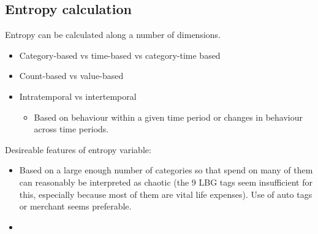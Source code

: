 




\subsection{Entropy calculation}%
\label{sub:entropy_calculation}


Entropy can be calculated along a number of dimensions.

\begin{itemize}
    \item Category-based vs time-based vs category-time based
        \citep{guidotti2015behavioral, krumme2013predictability}

    \item Count-based vs value-based

    \item Intratemporal vs intertemporal \citep{krumme2013predictability}

        \begin{itemize}
            \item Based on behaviour within a given time period or changes in
                behaviour across time periods.
        \end{itemize}
        
\end{itemize}

Desireable features of entropy variable:

\begin{itemize}
    \item Based on a large enough number of categories so that spend on many of
        them can reasonably be interpreted as chaotic (the 9 LBG tags seem
        insufficient for this, especially because most of them are vital life
        expenses). Use of auto tags or merchant seems preferable.

    \item 
\end{itemize}
